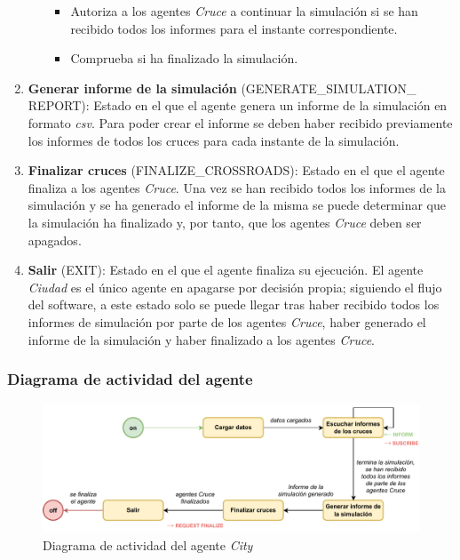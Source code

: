 \begin{enumerate}
\begin{itemize}
\begin{itemize}
                \item Autoriza a los agentes \textit{Cruce} a continuar la simulación si se han recibido todos los informes para el instante correspondiente.
                \item Comprueba si ha finalizado la simulación.
            \end{itemize}
    \end{itemize}
    \item \textbf{Generar informe de la simulación} \footnotesize(GENERATE\_SIMULATION\_ \newline REPORT)\normalsize: Estado en el que el agente genera un informe de la simulación en formato \textit{csv}. Para poder crear el informe se deben haber recibido previamente los informes de todos los cruces para cada instante de la simulación.
    \item \textbf{Finalizar cruces} \footnotesize(FINALIZE\_CROSSROADS)\normalsize: Estado en el que el agente finaliza a los agentes \textit{Cruce}. Una vez se han recibido todos los informes de la simulación y se ha generado el informe de la misma se puede determinar que la simulación ha finalizado y, por tanto, que los agentes \textit{Cruce} deben ser apagados.
    \item \textbf{Salir} \footnotesize(EXIT)\normalsize: Estado en el que el agente finaliza su ejecución. El agente \textit{Ciudad} es el único agente en apagarse por decisión propia; siguiendo el flujo del software, a este estado solo se puede llegar tras haber recibido todos los informes de simulación por parte de los agentes \textit{Cruce}, haber generado el informe de la simulación y haber finalizado a los agentes \textit{Cruce}.
\end{enumerate}

\subsubsection{Diagrama de actividad del agente}
\begin{figure}[H]
    \centering
    \includegraphics[width=1\linewidth]{text/image/DAgen-DA-City.pdf}
    \caption{Diagrama de actividad del agente \textit{City}}
    \label{fig:da_agente_ciudad}
\end{figure}


